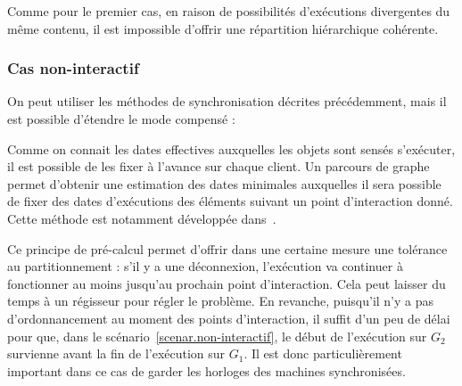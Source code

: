 \documentclass{article}
\newcommand\trigger{point d'interaction\xspace}
\begin{document}
\begin{itemize}
    Comme pour le premier cas, en raison de possibilités d'exécutions divergentes du même contenu, il est impossible d'offrir une répartition hiérarchique cohérente.
    
    \begin{figure}[h]
        \centering
        \begin{tikzpicture}
        
        \end{tikzpicture}
        \label{scenar.twobranches}
    \end{figure}

    
\end{itemize}



\subsubsection{Cas non-interactif}
On peut utiliser les méthodes de synchronisation décrites précédemment, mais il est possible d'étendre le mode compensé : 

Comme on connait les dates effectives auxquelles les objets sont sensés s'exécuter, il est possible de les fixer à l'avance sur chaque client. 
Un parcours de graphe permet d'obtenir une estimation des dates minimales auxquelles il sera possible de fixer des dates d'exécutions des éléments suivant un point d'interaction donné. 
Cette méthode est notamment développée dans~\cite{celerier2016rethinking}.

Ce principe de pré-calcul permet d'offrir dans une certaine mesure une tolérance au partitionnement : s'il y a une déconnexion, l'exécution va continuer à fonctionner au moins jusqu'au prochain \trigger.
Cela peut laisser du temps à un régisseur pour régler le problème.
En revanche, puisqu'il n'y a pas d'ordonnancement au moment des points d'interaction, il suffit d'un peu de délai pour que, dans le scénario~\ref{scenar.non-interactif}, le début de l'exécution sur $G_2$ survienne avant la fin de l'exécution sur $G_1$. 
Il est donc particulièrement important dans ce cas de garder les horloges des machines synchronisées.
\end{document}
